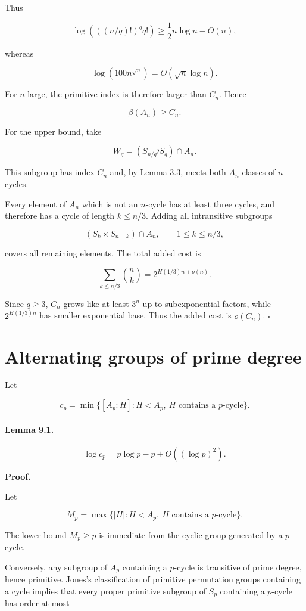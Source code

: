\documentclass[11pt]{article}
\begin{document}
Thus

\[
\log\left(((n/q)!)^q q!\right)
\ge
\frac12 n\log n-O(n),
\]

whereas

\[
\log(100n^{\sqrt n})=O(\sqrt n\log n).
\]

For $n$ large, the primitive index is therefore larger than $C_n$. Hence

\[
\beta(A_n)\ge C_n.
\]

For the upper bound, take

\[
W_q=(S_{n/q}\wr S_q)\cap A_n.
\]

This subgroup has index $C_n$ and, by Lemma 3.3, meets both $A_n$-classes of $n$-cycles.

Every element of $A_n$ which is not an $n$-cycle has at least three cycles, and therefore has a cycle of length $k\le n/3$. Adding all intransitive subgroups

\[
(S_k\times S_{n-k})\cap A_n,
\qquad
1\le k\le n/3,
\]

covers all remaining elements. The total added cost is

\[
\sum_{k\le n/3}\binom nk
=
2^{H(1/3)n+o(n)}.
\]

Since $q\ge3$, $C_n$ grows like at least $3^n$ up to subexponential factors, while $2^{H(1/3)n}$ has smaller exponential base. Thus the added cost is $o(C_n)$. $\square$

\section{Alternating groups of prime degree}

Let

\[
c_p=\min\{[A_p:H]:H<A_p,\ H\text{ contains a }p\text{-cycle}\}.
\]

\paragraph{Lemma 9.1.}

\[
\log c_p=p\log p-p+O((\log p)^2).
\]

\noindent\textbf{Proof.}

Let

\[
M_p=\max\{|H|:H<A_p,\ H\text{ contains a }p\text{-cycle}\}.
\]

The lower bound $M_p\ge p$ is immediate from the cyclic group generated by a $p$-cycle.

Conversely, any subgroup of $A_p$ containing a $p$-cycle is transitive of prime degree, hence primitive. Jones's classification of primitive permutation groups containing a cycle implies that every proper primitive subgroup of $S_p$ containing a $p$-cycle has order at most
\end{document}
